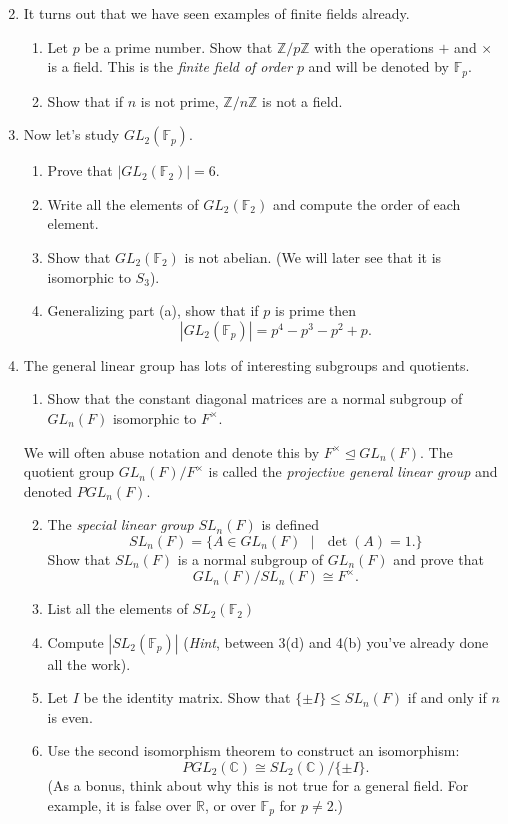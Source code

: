 \documentclass[11pt]{article}
\newcommand{\bC}{\mathbb{C}}
\newcommand{\bF}{\mathbb{F}}
\newcommand{\bR}{\mathbb{R}}
\newcommand{\bZ}{\mathbb{Z}}
\begin{document}
\begin{enumerate}
  \setcounter{enumi}{1}
  \item It turns out that we have seen examples of finite fields already.
  \begin{enumerate}
    \item Let $p$ be a prime number.  Show that $\bZ/p\bZ$ with the operations $+$ and $\times$ is a field.  This is the \textit{finite field of order} $p$ and will be denoted by $\bF_p$.
    \item Show that if $n$ is not prime, $\bZ/n\bZ$ is not a field.
  \end{enumerate}
\item Now let's study $GL_2(\bF_p)$.
  \begin{enumerate}
    \item Prove that $|GL_2(\bF_2)| = 6$.
    \item Write all the elements of $GL_2(\bF_2)$ and compute the order of each element.
    \item Show that $GL_2(\bF_2)$ is not abelian.  (We will later see that it is isomorphic to $S_3$).
    \item Generalizing part (a), show that if $p$ is prime then
    \[|GL_2(\bF_p)| = p^4-p^3-p^2+p.\]
  \end{enumerate}
  \item The general linear group has lots of interesting subgroups and quotients.
  \begin{enumerate}
    \item Show that the constant diagonal matrices are a normal subgroup of $GL_n(F)$ isomorphic to $F^\times$.
  \end{enumerate}
  We will often abuse notation and denote this by $F^\times\unlhd GL_n(F)$.  The quotient group $GL_n(F)/F^\times$ is called the \textit{projective general linear group} and denoted $PGL_n(F)$.
  \begin{enumerate}
    \setcounter{enumii}{1}
    \item The \textit{special linear group} $SL_n(F)$ is defined
    \[SL_n(F) = \{A\in GL_n(F)\text{ }|\text{ }\det(A) = 1.\}\]
    Show that $SL_n(F)$ is a normal subgroup of $GL_n(F)$ and prove that
    \[GL_n(F)/SL_n(F)\cong F^\times.\]
    \item List all the elements of $SL_2(\bF_2)$
    \item Compute $|SL_2(\bF_p)|$  (\textit{Hint}, between 3(d) and 4(b) you've already done all the work).
    \item Let $I$ be the identity matrix.  Show that $\{\pm I\}\le SL_n(F)$ if and only if $n$ is even.
    \item Use the second isomorphism theorem to construct an isomorphism:
    \[PGL_2(\bC)\cong SL_2(\bC)/\{\pm I\}.\]
    (As a bonus, think about why this is not true for a general field.  For example, it is false over $\bR$, or over $\bF_p$ for $p\not=2$.)
  \end{enumerate}
\end{enumerate}
\end{document}

